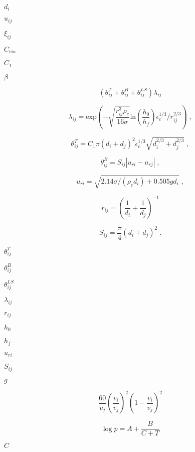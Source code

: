 \documentclass{article}
\begin{document}
$        d_i         $
\pagebreak

$        u_{ij}      $
\pagebreak

$        \xi_{ij}    $
\pagebreak

$        C_{vm}      $
\pagebreak

$        C_1         $
\pagebreak

$        \beta       $
\pagebreak

\[
    \left( \theta_{ij}^{T} + \theta_{ij}^{B} + \theta_{ij}^{LS} \right)
    \lambda_{ij}
\]
\pagebreak

\[
    \lambda_{ij} =
        \mathrm{exp}
        \left(
          - \sqrt{\frac{r_{ij}^3 \rho_c}{16 \sigma}}
            \mathrm{ln} \left(\frac{h_0}{h_f}\right)
            \epsilon_c^{1/3}/r_{ij}^{2/3}
        \right)\;,
\]
\pagebreak

\[
    \theta_{ij}^{T} =
        C_1 \pi (d_i + d_j)^{2} \epsilon_c^{1/3}
        \sqrt{d_{i}^{2/3} + d_{j}^{2/3}}\;,
\]
\pagebreak

\[
    \theta_{ij}^{B} = S_{ij} \left| u_{ri} - u_{rj} \right|\;,
\]
\pagebreak

\[
    u_{ri} = \sqrt{2.14 \sigma / \left(\rho_c d_i \right) + 0.505 g d_i}\;,
\]
\pagebreak

\[
    r_{ij} = \left( \frac{1}{d_i} + \frac{1}{d_j} \right)^{-1}
\]
\pagebreak

\[
    S_{ij} = \frac{\pi}{4} \left(d_i + d_j\right)^{2}\;.
\]
\pagebreak

$        \theta_{ij}^{T}   $
\pagebreak

$        \theta_{ij}^{B}   $
\pagebreak

$        \theta_{ij}^{LS}  $
\pagebreak

$        \lambda_{ij}      $
\pagebreak

$        r_{ij}            $
\pagebreak

$        h_0               $
\pagebreak

$        h_f               $
\pagebreak

$        u_{ri}            $
\pagebreak

$        S_{ij}            $
\pagebreak

$        g                 $
\pagebreak

\[
    \frac{60}{v_j} \left(\frac{v_i}{v_j}\right)^{2}
    \left(1 - \frac{v_i}{v_j}\right)^{2}
\]
\pagebreak

\[
    \log p = A + \frac{B}{C + T}
\]
\pagebreak

$C$
\pagebreak
\end{document}
